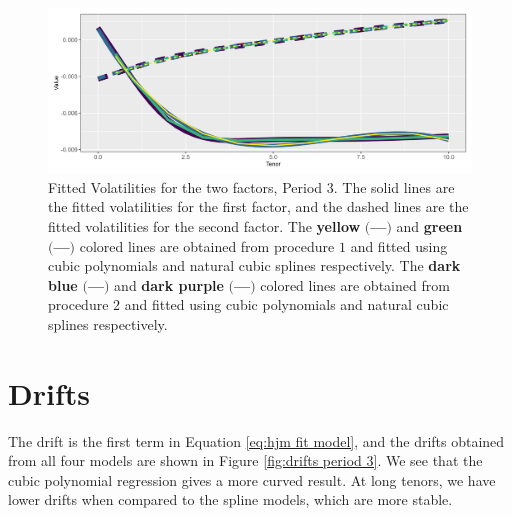 \vfill

\begin{figure}[!htbp]
    \centering
    \includegraphics[width=.95\linewidth]{Figures/Fitted Volatilities/zero_coupon_yields_phase_3_HJM_2F_small_fitted_volatilities_plot.png}
    
    \caption[Fitted Volatilities for the two factors, Period 3]{Fitted Volatilities for the two factors, Period 3. The solid lines are the fitted volatilities for the first factor, and the dashed lines are the fitted volatilities for the second factor. The \textbf{yellow} $\bigl($\textcolor{yellow_}{\textbf{---}}$\bigr)$ and \textbf{green} $\bigl($\textcolor{green_}{\textbf{---}}$\bigr)$ colored lines are obtained from procedure $1$ and fitted using cubic polynomials and natural cubic splines respectively. The \textbf{dark blue} $\bigl($\textcolor{dark_blue_1}{\textbf{---}}$\bigr)$ and \textbf{dark purple} $\bigl($\textcolor{dark_purple_}{\textbf{---}}$\bigr)$ colored lines are obtained from procedure $2$ and fitted using cubic polynomials and natural cubic splines respectively.}
    \label{fig:fitted volatilites period 3}
\end{figure}

\vfill


\newpage

\section{Drifts}

\noindent The drift is the first term in Equation \eqref{eq:hjm fit model}, and the drifts obtained from all four models are shown in Figure \ref{fig:drifts period 3}. We see that the cubic polynomial regression gives a more curved result. At long tenors, we have lower drifts when compared to the spline models, which are more stable. 

